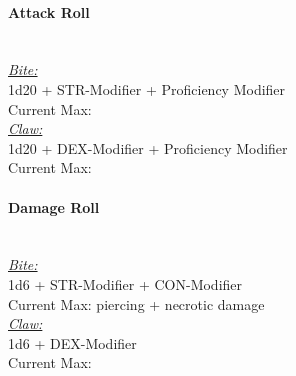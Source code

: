 \documentclass[letterpaper,openany,oneside,twocolumn]{book}
\newcommand{\PATH}{../../}
\begin{document}
\paragraph*{Attack Roll}\hfill\\
\underline{\textit{Bite:}}\\
1d20 + STR-Modifier + Proficiency Modifier\\
\indent Current Max: \\
\underline{\textit{Claw:}}\\
1d20 + DEX-Modifier + Proficiency Modifier\\
\indent Current Max: 
\paragraph*{Damage Roll}\hfill\\
\underline{\textit{Bite:}}\\
1d6 + STR-Modifier + CON-Modifier\\
\indent Current Max:  piercing +  necrotic damage\\
\underline{\textit{Claw:}}\\
1d6 + DEX-Modifier\\
\indent Current Max: 




\end{document}
